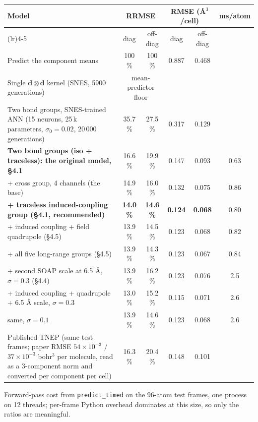 \documentclass[11pt,a4paper]{article}
\begin{document}
\begin{center}\footnotesize\setlength{\tabcolsep}{4pt}
\begin{tabular}{@{}>{\raggedright\arraybackslash}p{5.0cm}ccccc@{}}
\toprule
Model & \multicolumn{2}{c}{RRMSE} & \multicolumn{2}{c}{RMSE (\AA{}$^3$/cell)} & ms/atom \\
\cmidrule(lr){2-3}\cmidrule(lr){4-5}
 & diag & off-diag & diag & off-diag & \\
\midrule
Predict the component means & 100 \% & 100 \% & 0.887 & 0.468 & \\
Single $\mathbf d\otimes\mathbf d$ kernel (SNES, 5900 generations) & \multicolumn{2}{c}{mean-predictor floor} & & & \\
Two bond groups, SNES-trained ANN (15 neurons, 25\,k parameters, $\sigma_0=0.02$, 20\,000 generations) & 35.7 \% & 27.5 \% & 0.317 & 0.129 & \\
\textbf{Two bond groups (iso + traceless): the original model, §4.1} & 16.6 \% & 19.9 \% & 0.147 & 0.093 & 0.63 \\
+ cross group, 4 channels (the base) & 14.9 \% & 16.0 \% & 0.132 & 0.075 & 0.86 \\
\textbf{+ traceless induced-coupling group (§4.1, recommended)} & \textbf{14.0 \%} & \textbf{14.6 \%} & \textbf{0.124} & \textbf{0.068} & 0.80 \\
+ induced coupling + field quadrupole (§4.5) & 13.9 \% & 14.5 \% & 0.123 & 0.068 & 0.82 \\
+ all five long-range groups (§4.5) & 13.9 \% & 14.3 \% & 0.123 & 0.067 & 0.84 \\
+ second SOAP scale at 6.5 \AA{}, $\sigma=0.3$ (§4.4) & 13.9 \% & 16.2 \% & 0.123 & 0.076 & 2.5 \\
+ induced coupling + quadrupole + 6.5 \AA{} scale, $\sigma=0.3$ & 13.0 \% & 15.2 \% & 0.115 & 0.071 & 2.6 \\
\quad same, $\sigma=0.1$ & 13.9 \% & 14.6 \% & 0.123 & 0.068 & 2.6 \\
Published TNEP (same test frames; paper RMSE $54\times10^{-3}$ / $37\times10^{-3}$ bohr$^3$ per molecule, read as a 3-component norm and converted per component per cell) & 16.3 \% & 20.4 \% & 0.148 & 0.101 & \\
\bottomrule
\end{tabular}
\end{center}

Forward-pass cost from \texttt{predict\_timed} on the 96-atom test frames, one process on 12
threads; per-frame Python overhead dominates at this size, so only the ratios are meaningful.
\end{document}
